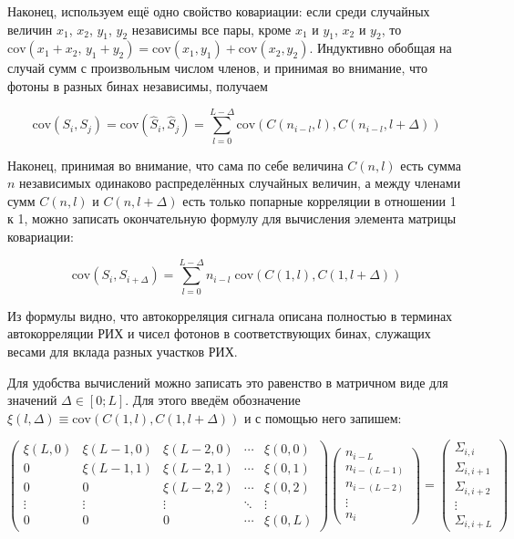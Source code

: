 \documentclass[12pt]{book}
\newcommand{\cov}{\mathrm{cov}}
\begin{document}
	Наконец, используем ещё одно свойство ковариации: если среди случайных величин $x_1$, $x_2$, $y_1$, $y_2$ независимы все пары, кроме $x_1$ и $y_1$, $x_2$ и $y_2$, то $\cov(x_1 + x_2, \, y_1 + y_2) = \cov(x_1, y_1) + \cov(x_2, y_2)$. Индуктивно обобщая на случай сумм с произвольным числом членов, и принимая во внимание, что фотоны в разных бинах независимы, получаем
	
	\begin{equation}
		\cov(S_i, S_j) = \cov(\hat{S}_i, \hat{S}_j) = \sum_{l=0}^{L - \Delta} \cov(C(n_{i-l}, l), C(n_{i-l}, l + \Delta))
	\end{equation}

	Наконец, принимая во внимание, что сама по себе величина $C(n, l)$ есть сумма $n$ независимых одинаково распределённых случайных величин, а между членами сумм $C(n, l)$ и $C(n, l + \Delta)$ есть только попарные корреляции в отношении 1 к 1, можно записать окончательную формулу для вычисления элемента матрицы ковариации:
	
	\begin{equation}
		\cov(S_i, S_{i + \Delta}) = \sum_{l=0}^{L - \Delta} n_{i-l} \; \cov\left(C(1, l), C(1, l + \Delta)\right)
	\end{equation}

	Из формулы видно, что автокорреляция сигнала описана полностью в терминах автокорреляции РИХ и чисел фотонов в соответствующих бинах, служащих весами для вклада разных участков РИХ.
	
	Для удобства вычислений можно записать это равенство в матричном виде для значений $\Delta \in \left[0; L\right]$. Для этого введём обозначение $\xi(l, \Delta) \equiv \cov\left(C(1, l), C(1, l + \Delta)\right)$ и с помощью него запишем:
	
	\begin{equation}
		\begin{pmatrix} 
			\xi(L, 0) & \xi(L-1, 0) & \xi(L-2, 0) & \dotsm & \xi(0, 0) \\
			     0    & \xi(L-1, 1) & \xi(L-2, 1) & \dotsm & \xi(0, 1) \\
				 0    &      0      & \xi(L-2, 2) & \dotsm & \xi(0, 2) \\
			   \vdots &   \vdots    &    \vdots   & \ddots &   \vdots  \\
			     0    &      0      &      0      & \dotsm & \xi(0, L)
		\end{pmatrix}
		\begin{pmatrix} 
			n_{i-L} \\ n_{i-(L-1)} \\ n_{i-(L-2)} \\ \vdots \\ n_{i}
		\end{pmatrix}
		=
		\begin{pmatrix} 
			\Sigma_{i, i} \\
			\Sigma_{i, i+1} \\ 
			\Sigma_{i, i+2} \\ 
			\vdots \\ 
			\Sigma_{i, i+L}
		\end{pmatrix}
		\label{eq:Xi-matrix-for-Sigma-calculation}
	\end{equation}
\end{document}
